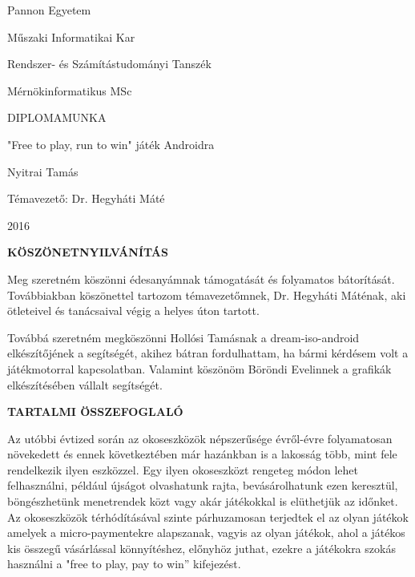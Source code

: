 \documentclass[a4paper,oneside,10pt]{report}
\begin{document}
\begin{titlepage}
\begin{center}
\Large
Pannon Egyetem

\vspace{10mm}
Műszaki Informatikai Kar

\vspace{10mm}
Rendszer- és Számítástudományi Tanszék

\vspace{10mm}
Mérnökinformatikus MSc

\vspace{40mm}
\huge
DIPLOMAMUNKA

\vspace{10mm}
\LARGE
"Free to play, run to win" játék Androidra

\vspace{10mm}
\Large
Nyitrai Tamás

\vspace{40mm}
Témavezető: Dr. Hegyháti Máté

\vspace{10mm}
2016
\normalsize
\end{center}
\end{titlepage}



\pagestyle{empty} %



\newpage
\Large
\begin{center}
	\textbf{KÖSZÖNETNYILVÁNÍTÁS}
\end{center}
\normalsize
\noindent
Meg szeretném köszönni édesanyámnak támogatását és folyamatos bátorítását. Továbbiakban köszönettel tartozom témavezetőmnek, Dr. Hegyháti Máténak, aki ötleteivel és tanácsaival végig a helyes úton tartott.

Továbbá szeretném megköszönni Hollósi Tamásnak a dream-iso-android elkészítőjének a segítségét, akihez bátran fordulhattam, ha bármi kérdésem volt a játékmotorral kapcsolatban. Valamint köszönöm Böröndi Evelinnek a grafikák elkészítésében vállalt segítségét.
\newpage
\Large
\begin{center}
	\textbf{TARTALMI ÖSSZEFOGLALÓ}
\end{center}
\normalsize
\noindent

Az utóbbi évtized során az okoseszközök népszerűsége évről-évre folyamatosan növekedett és ennek következtében már hazánkban is a lakosság több, mint fele rendelkezik ilyen eszközzel. 
Egy ilyen okoseszközt rengeteg módon lehet felhasználni, például újságot olvashatunk rajta, bevásárolhatunk ezen keresztül, böngészhetünk menetrendek közt vagy akár játékokkal is elüthetjük az időnket. 
Az okoseszközök térhódításával szinte párhuzamosan terjedtek el az olyan játékok amelyek a micro-paymentekre alapszanak, vagyis az olyan játékok, ahol a játékos kis összegű vásárlással könnyítéshez, előnyhöz juthat, ezekre a játékokra szokás használni a "free to play, pay to win” kifejezést.
\end{document}
